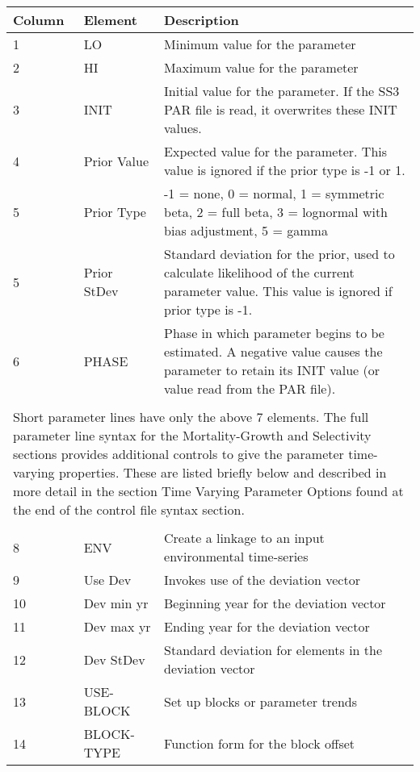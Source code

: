 \begin{center}
	\begin{tabular}{p{2cm} p{3cm} p{10cm}}
		Column & Element & Description\\
		\hline
		1 & LO & Minimum value for the parameter\\
		2 & HI & Maximum value for the parameter\\
		3 & INIT & Initial value for the parameter.  If the SS3 PAR file is read, it overwrites these INIT values.\\
		4 & Prior Value & Expected value for the parameter.  This value is ignored if the prior type is -1 or 1.\\
		5 & Prior Type  & -1 = none, 0 = normal, 1 = symmetric beta, 2 = full beta, 3 = lognormal with bias adjustment, 5 = gamma\\
		5 & Prior StDev & Standard deviation for the prior, used to calculate likelihood of the current parameter value. This value is ignored if prior type is -1. \\
		6 & PHASE & Phase in which parameter begins to be estimated.  A negative value causes the parameter to retain its INIT value (or value read from the PAR file).\\
		 & & \\
		\multicolumn{3}{l}{\parbox{16cm}{Short parameter lines have only the above 7 elements.  The full parameter line syntax for the Mortality-Growth and Selectivity sections provides additional controls to give the parameter time-varying properties.  These are listed briefly below and described in more detail in the section Time Varying Parameter Options found at the end of the control file syntax section.}}\\
		 & & \\
		8 & ENV & Create a linkage to an input environmental time-series\\
		9 & Use Dev & Invokes use of the deviation vector \\
		10 & Dev min yr & Beginning year for the deviation vector \\
		11 & Dev max yr & Ending year for the deviation vector\\
		12 & Dev StDev & Standard deviation for elements in the deviation vector \\
		13 & USE-BLOCK & Set up blocks or parameter trends\\
		14 & BLOCK-TYPE & Function form for the block offset\\
		\hline
	\end{tabular}
\end{center}

